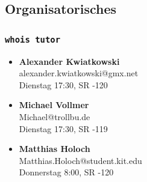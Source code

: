 \subsection{Organisatorisches}

\begin{frame}
	\frametitle{\texttt{whois tutor}}
	
	\begin{itemize}
		\item \textbf{Alexander Kwiatkowski} \\ alexander.kwiatkowski@gmx.net \\ Dienstag 17:30, SR -120
		\item \textbf{Michael Vollmer} \\ Michael@trollbu.de \\ Dienstag 17:30, SR -119
		\item \textbf{Matthias Holoch} \\ Matthias.Holoch@student.kit.edu \\ Donnerstag 8:00, SR -120
	\end{itemize}
\end{frame}

